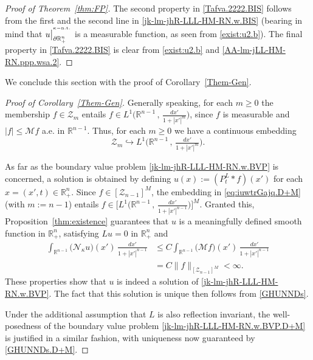 \documentclass[11pt,reqno]{amsart}
\numberwithin{equation}{section}
\theoremstyle{remark}
\begin{document}
\begin{proof}[Proof of Theorem~\ref{thm:FP}]
The second property in \eqref{Tafva.2222.BIS} follows from the first and the second line in \eqref{jk-lm-jhR-LLL-HM-RN.w.BIS}
(bearing in mind that $u\big|^{{}^{\kappa-{\rm n.t.}}}_{\partial\mathbb{R}^{n}_{+}}$ is a measurable function, as seen from 
\eqref{exist:u2.b}). The final property in \eqref{Tafva.2222.BIS} is clear from \eqref{exist:u2.b} and \eqref{AA-lm-jLL-HM-RN.ppp.wsa.2}.
\end{proof}

We conclude this section with the proof of Corollary~\ref{Them-Gen}.

\vskip 0.08in
\begin{proof}[Proof of Corollary~\ref{Them-Gen}]
Generally speaking, for each $m\geq 0$ the membership 
$f\in{\mathscr{Z}}_{m}$ entails $f\in L^1\big({\mathbb{R}}^{n-1}\,,\,\tfrac{dx'}{1+|x'|^{m}}\big)$,
since $f$ is measurable and $|f|\leq{\mathcal{M}}f$ a.e. in ${\mathbb{R}}^{n-1}$. Thus, for each $m\geq 0$ we have a 
continuous embedding
%
\begin{equation}\label{eq:iuwtrGajq.D+M}
{\mathscr{Z}}_{m}\hookrightarrow L^1\big({\mathbb{R}}^{n-1}\,,\,\tfrac{dx'}{1+|x'|^{m}}\big).
\end{equation}

As far as the boundary value problem \eqref{jk-lm-jhR-LLL-HM-RN.w.BVP} is concerned, a solution is obtained 
by defining $u(x):=(P^L_t\ast f)(x')$ for each $x=(x',t)\in{\mathbb{R}}^n_{+}$. 
Since $f\in[{\mathscr{Z}}_{n-1}]^M$, the embedding in \eqref{eq:iuwtrGajq.D+M} (with $m:=n-1$) entails 
$f\in\Big[L^1\big({\mathbb{R}}^{n-1}\,,\,\tfrac{dx'}{1+|x'|^{n-1}}\big)\big]^M$. Granted this, Proposition~\ref{thm:existence}
guarantees that $u$ is a meaningfully defined smooth function in ${\mathbb{R}}^n_{+}$, satisfying $Lu=0$ in ${\mathbb{R}}^n_{+}$ and
%
\begin{align}\label{hytftrdtrfahafa767fd}
\int_{\mathbb{R}^{n-1}}\big({\mathcal{N}}_{\kappa}u\big)(x')\,\frac{dx'}{1+|x'|^{n-1}}
&\leq C\int_{\mathbb{R}^{n-1}}\big({\mathcal{M}}f\big)(x')\,\frac{dx'}{1+|x'|^{n-1}}
\nonumber\\[4pt]
&=C\|f\|_{[{\mathscr{Z}}_{n-1}]^M}<\infty.
\end{align}
%
These properties show that $u$ is indeed a solution of \eqref{jk-lm-jhR-LLL-HM-RN.w.BVP}.
The fact that this solution is unique then follows from \eqref{GHUNNDs}.

Under the additional assumption that $L$ is also reflection invariant, the well-posedness of the boundary value problem 
\eqref{jk-lm-jhR-LLL-HM-RN.w.BVP.D+M} is justified in a similar fashion, with uniqueness now guaranteed by \eqref{GHUNNDs.D+M}.
\end{proof}
\end{document}
